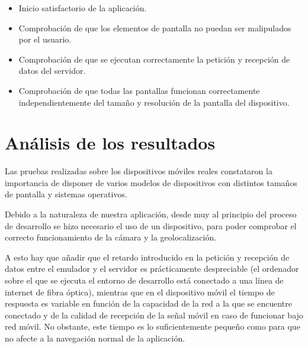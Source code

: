 \begin{itemize}
	\item Inicio satisfactorio de la aplicación.
	\item Comprobación de que los elementos de pantalla no puedan ser malipulados por el usuario.
	\item Comprobación de que se ejecutan correctamente la petición y recepción de datos del servidor.
	\item Comprobación de que todas las pantallas funcionan correctamente independientemente del tamaño y resolución de la pantalla del dispositivo.
\end{itemize}

\section{Análisis de los resultados}
Las pruebas realizadas sobre los dispositivos móviles reales constataron la importancia de disponer de varios modelos de dispositivos con distintos tamaños de pantalla y sistemas operativos.

Debido a la naturaleza de nuestra aplicación, desde muy al principio del proceso de desarrollo se hizo necesario el uso de un dispositivo, para poder comprobar el correcto funcionamiento de la cámara y la geolocalización.

A esto hay que añadir que el retardo introducido en la petición y recepción de datos entre el emulador y el servidor es prácticamente despreciable (el ordenador sobre el que se ejecuta el entorno de desarrollo está conectado a una línea de internet de fibra óptica), mientras que en el dispositivo móvil el tiempo de respuesta es variable en función de la capacidad de la red a la que se encuentre conectado y de la calidad de recepción de la señal móvil en caso de funcionar bajo red móvil. No obstante, este tiempo es lo suficientemente pequeño como para que no afecte a la navegación normal de la aplicación.

\chapterend